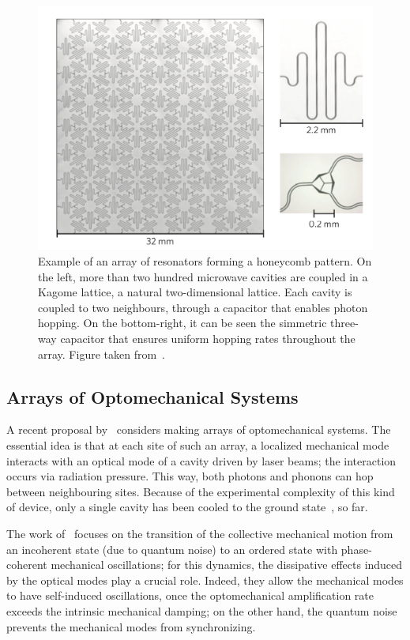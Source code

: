 \begin{figure}
    \centering
    \includegraphics[scale=0.6]{Figures/superconducting_circuits.png}
    \captionsetup{width=1.\linewidth}
    \caption{Example of an array of resonators forming a honeycomb pattern. On the left, more than two hundred microwave cavities are coupled in a Kagome lattice, a natural two-dimensional lattice. Each cavity is coupled to two neighbours, through a capacitor that enables photon hopping. On the bottom-right, it can be seen the simmetric three-way capacitor that ensures uniform hopping rates throughout the array. Figure taken from~\cite{Nat.Phys2012}.}
    \label{fig:superconducting_circuits}
\end{figure}

\subsection{Arrays of Optomechanical Systems}
A recent proposal by~\cite{optomechanical_arrays} considers making arrays of optomechanical systems. The essential idea is that at each site of such an array, a localized mechanical mode interacts with an optical mode of a cavity driven by laser beams; the interaction occurs via radiation pressure. This way, both photons and phonons can hop between neighbouring sites. Because of the experimental complexity of this kind of device, only a single cavity has been cooled to the ground state~\cite{Lee_Haffner_Cross}, so far. 

The work of~\cite{optomechanical_arrays} focuses on the transition of the collective mechanical motion from an incoherent state (due to quantum noise) to an ordered state with phase-coherent mechanical oscillations; for this dynamics, the dissipative effects induced by the optical modes play a crucial role. Indeed, they allow the mechanical modes to have self-induced oscillations, once the optomechanical amplification rate exceeds the intrinsic mechanical damping; on the other hand, the quantum noise prevents the mechanical modes from synchronizing.


